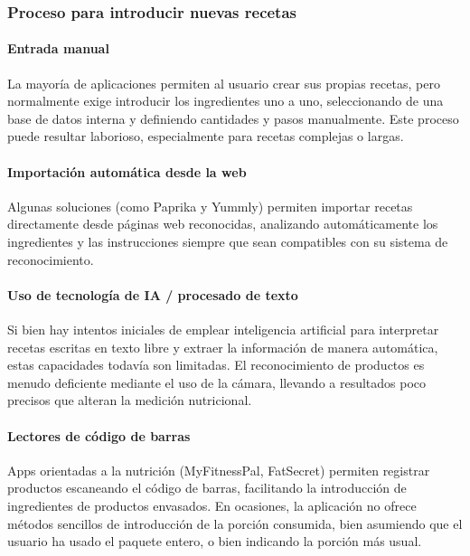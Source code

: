 \subsubsection*{Proceso para introducir nuevas recetas}

\paragraph*{Entrada manual}
La mayoría de aplicaciones permiten al usuario crear sus propias recetas, pero normalmente exige introducir los ingredientes uno a uno, seleccionando de una base de datos interna y definiendo cantidades y pasos manualmente. Este proceso puede resultar laborioso, especialmente para recetas complejas o largas.

\paragraph*{Importación automática desde la web}
Algunas soluciones (como Paprika y Yummly) permiten importar recetas directamente desde páginas web reconocidas, analizando automáticamente los ingredientes y las instrucciones siempre que sean compatibles con su sistema de reconocimiento.

\paragraph*{Uso de tecnología de IA / procesado de texto}
Si bien hay intentos iniciales de emplear inteligencia artificial para interpretar recetas escritas en texto libre y extraer la información de manera automática, estas capacidades todavía son limitadas. El reconocimiento de productos es menudo deficiente mediante el uso de la cámara, llevando a resultados poco precisos que alteran la medición nutricional.

\paragraph*{Lectores de código de barras}
Apps orientadas a la nutrición (MyFitnessPal, FatSecret) permiten registrar productos escaneando el código de barras, facilitando la introducción de ingredientes de productos envasados. En ocasiones, la aplicación no ofrece métodos sencillos de introducción de la porción consumida, bien asumiendo que el usuario ha usado el paquete entero, o bien indicando la porción más usual.

